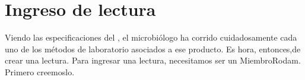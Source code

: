 \documentclass[letterpaper,10pt,spanish]{sphinxmanual}
\begin{document}
\begin{sphinxVerbatim}[commandchars=\\\{\}]
                                      
              
                         
\end{sphinxVerbatim}


\section{Ingreso de lectura}
\label{\detokenize{requerimientos/laboratorio_aceptacion:ingreso-de-lectura}}
Viendo las especificaciones del , el microbiólogo ha corrido
cuidadosamente cada uno de los métodos de laboratorio asociados a ese
producto. Es hora, entonces,de crear una lectura. Para ingresar una
lectura, necesitamos ser un MiembroRodam. Primero creemoslo.
\end{document}

